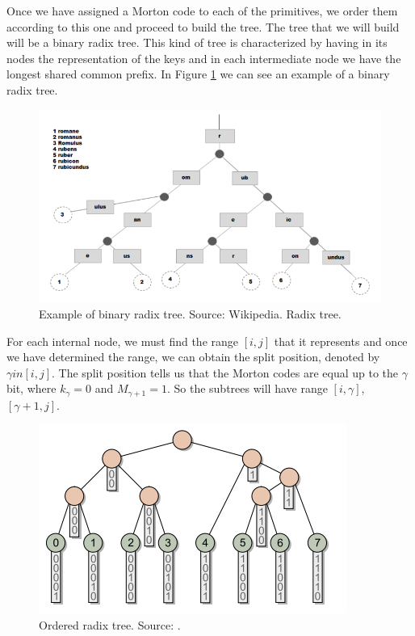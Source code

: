 \documentclass[titlepage,12pt]{report}
\begin{document}
Once we have assigned a Morton code to each of the primitives, we order them according to this one and proceed to build the tree. The tree that we will build will be a binary radix tree. This kind of tree is characterized by having in its nodes the representation of the keys and in each intermediate node we have the longest shared common prefix. In Figure \ref{radix} we can see an example of a binary radix tree.

\begin{figure}[H]
	\centering
	\includegraphics[scale=0.45]{media/radixtree.png}
	\caption{Example of binary radix tree. Source: Wikipedia. Radix tree.}
	\label{radix}
\end{figure}

For each internal node, we must find the range $[i,j]$ that it represents and once we have determined the range, we can obtain the split position, denoted by $\gamma in [i,j]$. The split position tells us that the Morton codes are equal up to the $\gamma$ bit, where $k_{\gamma} = 0$ and $M_{\gamma +1} = 1$. So the subtrees will have range $[i, \gamma]$, $[\gamma+1,j]$.

\begin{figure}[H]
	\centering
	\includegraphics[scale=0.45]{media/radix_tero_1.png}
	\caption{Ordered radix tree. Source: \citep{Karras2012}.}
	\label{radix_tero}
\end{figure}
\end{document}
